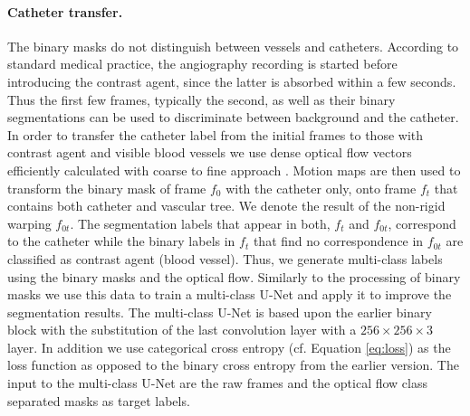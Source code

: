 \documentclass{bmvc2k}
\begin{document}





\paragraph{Catheter transfer. } 
The binary masks  do not distinguish between vessels and catheters.
According to standard medical practice, the angiography recording is started before introducing the contrast agent, since the latter is absorbed within a few seconds. Thus the first few frames, typically the second, as well as their binary segmentations can be used to discriminate between background and the catheter. In order to transfer the catheter label from the initial frames to those with contrast agent and visible blood vessels we use dense optical flow vectors efficiently calculated with coarse to fine approach \cite{arXiv:1612.06370}.
Motion maps are then used to transform the binary mask of frame $f_0$ with the catheter only, onto frame $f_{t}$ that contains both catheter and vascular tree. We denote the result of the non-rigid warping $f_{0t}$. The segmentation labels that appear in both, $f_t$ and  $f_{0t}$, correspond to the catheter while the binary labels in $f_t$ that find no correspondence in $f_{0t}$ are classified as contrast agent (blood vessel). Thus, we generate multi-class  labels using the binary masks and the optical flow.  Similarly to the processing of binary masks we use this data to train a multi-class U-Net and apply it to improve the segmentation results.  The multi-class U-Net is based upon the earlier binary block with the substitution of the last convolution layer with a $256\times256\times3$ layer. In addition we use categorical cross entropy (cf. Equation \ref{eq:loss}) as the loss function as opposed to the binary cross entropy from the earlier version. The input to the multi-class U-Net are the raw frames and the optical flow class separated masks as target labels.
\end{document}
